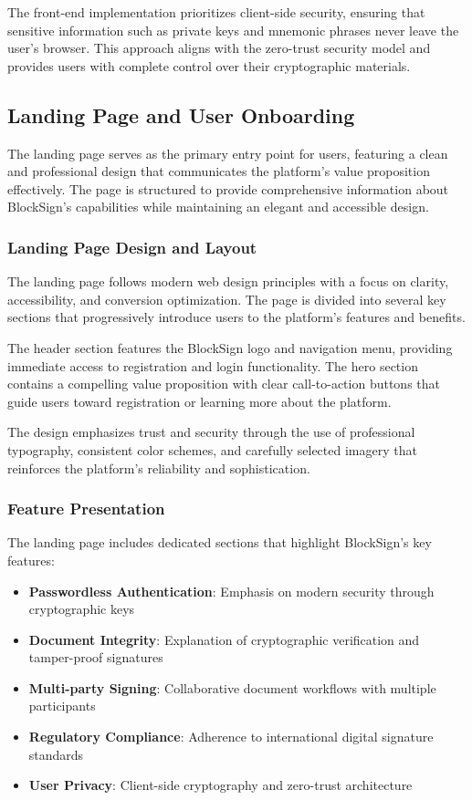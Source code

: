 The front-end implementation prioritizes client-side security, ensuring that sensitive information such as private keys and mnemonic phrases never leave the user's browser. This approach aligns with the zero-trust security model and provides users with complete control over their cryptographic materials.

\subsection{Landing Page and User Onboarding}
The landing page serves as the primary entry point for users, featuring a clean and professional design that communicates the platform's value proposition effectively. The page is structured to provide comprehensive information about BlockSign's capabilities while maintaining an elegant and accessible design.

\subsubsection{Landing Page Design and Layout}
The landing page follows modern web design principles with a focus on clarity, accessibility, and conversion optimization. The page is divided into several key sections that progressively introduce users to the platform's features and benefits.

The header section features the BlockSign logo and navigation menu, providing immediate access to registration and login functionality. The hero section contains a compelling value proposition with clear call-to-action buttons that guide users toward registration or learning more about the platform.

The design emphasizes trust and security through the use of professional typography, consistent color schemes, and carefully selected imagery that reinforces the platform's reliability and sophistication.

\subsubsection{Feature Presentation}
The landing page includes dedicated sections that highlight BlockSign's key features:

\begin{itemize}
    \item \textbf{Passwordless Authentication}: Emphasis on modern security through cryptographic keys
    \item \textbf{Document Integrity}: Explanation of cryptographic verification and tamper-proof signatures
    \item \textbf{Multi-party Signing}: Collaborative document workflows with multiple participants
    \item \textbf{Regulatory Compliance}: Adherence to international digital signature standards
    \item \textbf{User Privacy}: Client-side cryptography and zero-trust architecture
\end{itemize}

